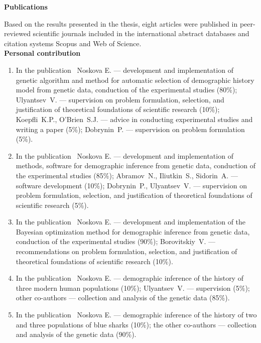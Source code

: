 \textbf{Publications}

Based on the results presented in the thesis, eight articles were published in peer-reviewed scientific journals included in the international abstract databases and citation systems Scopus and Web of Science.\\


\textbf{Personal contribution}

\begin{enumerate}[label=\arabic*.]
    \item 
    In the publication~\cite{noskova2020gadma} Noskova E. --- development and implementation of genetic algorithm and method for automatic selection of demographic history model from genetic data, conduction of the experimental studies (80\%); Ulyantsev~V. --- supervision on problem formulation, selection, and justification of theoretical foundations of scientific research (10\%); Koepfli~K.P., O'Brien~S.J. --- advice in conducting experimental studies and writing a paper (5\%); Dobrynin~P. --- supervision on problem formulation (5\%).

    \item %
    In the publication~\cite{noskova2023gadma2} Noskova E. --- development and implementation of methods, software for demographic inference from genetic data, conduction of the experimental studies (85\%); Abramov~N., Iliutkin~S., Sidorin~A. --- software development (10\%); Dobrynin~P., Ulyantsev~V. --- supervision on problem formulation, selection, and justification of theoretical foundations of scientific research (5\%).

    \item %
    In the publication~\cite{noskova2023bayesian} Noskova E. --- development and implementation of the Bayesian optimization method for demographic inference from genetic data, conduction of the experimental studies (90\%); Borovitskiy~V. --- recommendations on problem formulation, selection, and justification of theoretical foundations of scientific research (10\%).

    \item %
    In the publication~\cite{zhernakova2020genome} Noskova E. --- demographic inference of the history of three  modern human populations (10\%); Ulyantsev~V. --- supervision (5\%); other co-authors --- collection and analysis of the genetic data (85\%).

    \item %
    In the publication~\cite{nikolic2022stepping} Noskova E. --- demographic inference of the history of two and three populations of blue sharks (10\%); the other co-authors --- collection and analysis of the genetic data (90\%).


\end{enumerate}
